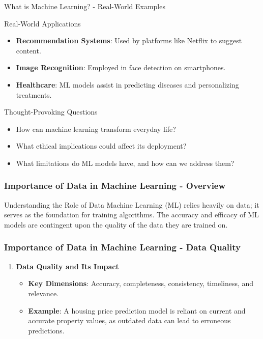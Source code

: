 \documentclass[aspectratio=169]{beamer}
\begin{document}
\begin{frame}[fragile]{What is Machine Learning? - Real-World Examples}
    \begin{block}{Real-World Applications}
        \begin{itemize}
            \item \textbf{Recommendation Systems}: Used by platforms like Netflix to suggest content.
            \item \textbf{Image Recognition}: Employed in face detection on smartphones.
            \item \textbf{Healthcare}: ML models assist in predicting diseases and personalizing treatments.
        \end{itemize}
    \end{block}
    
    \begin{block}{Thought-Provoking Questions}
        \begin{itemize}
            \item How can machine learning transform everyday life?
            \item What ethical implications could affect its deployment?
            \item What limitations do ML models have, and how can we address them?
        \end{itemize}
    \end{block}
\end{frame}

\begin{frame}[fragile]
    \frametitle{Importance of Data in Machine Learning - Overview}
    \begin{block}{Understanding the Role of Data}
        Machine Learning (ML) relies heavily on data; it serves as the foundation for training algorithms. The accuracy and efficacy of ML models are contingent upon the quality of the data they are trained on. 
    \end{block}
\end{frame}

\begin{frame}[fragile]
    \frametitle{Importance of Data in Machine Learning - Data Quality}
    \begin{enumerate}
        \item \textbf{Data Quality and Its Impact}
        \begin{itemize}
            \item \textbf{Key Dimensions}: Accuracy, completeness, consistency, timeliness, and relevance.
            \item \textbf{Example}: A housing price prediction model is reliant on current and accurate property values, as outdated data can lead to erroneous predictions.
        \end{itemize}
    \end{enumerate}
\end{frame}
\end{document}
